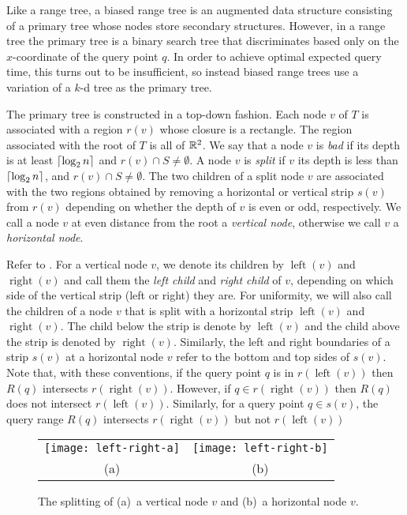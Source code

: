 \documentclass[charterfonts]{patmorin}
\DeclareMathOperator{\lft}{left}
\DeclareMathOperator{\rght}{right}
\begin{document}
Like a range tree, a biased range tree is an augmented data structure
consisting of a primary tree whose nodes store secondary structures.
However, in a range tree the primary tree is a binary search tree that
discriminates based only on the $x$-coordinate of the query point $q$.
In order to achieve optimal expected query time, this turns out to be
insufficient, so instead biased range trees use a variation of a $k$-d
tree as the primary tree.

The primary tree is constructed in a top-down fashion.  Each node $v$
of $T$ is associated with a region $r(v)$ whose closure is a
rectangle.  The region associated with the root of $T$ is all of
$\mathbb{R}^2$.  We say that a node $v$ is \emph{bad} if its depth is at least
$\left\lceil \log_2 n \right\rceil$ and $r(v)\cap S \neq \emptyset$.  A node $v$ is
\emph{split} if $v$ its depth is less than $\left\lceil \log_2 n \right\rceil$, and
$r(v)\cap S\neq \emptyset$.  The two children of a split node $v$ are
associated with the two regions obtained by removing a horizontal or
vertical strip $s(v)$ from $r(v)$ depending on whether the depth of
$v$ is even or odd, respectively.  We call a node $v$ at even distance
from the root a \emph{vertical node}, otherwise we call $v$ a
\emph{horizontal node}. 

Refer to .  For a vertical node $v$, we denote its
children by $\lft(v)$ and $\rght(v)$ and call them the \emph{left
child} and \emph{right child} of $v$, depending on which side of the
vertical strip (left or right) they are.  For uniformity, we will also
call the children of a node $v$ that is split with a horizontal strip
$\lft(v)$ and $\rght(v)$.  The child below the strip is denote by $\lft(v)$ and
the child above the strip is denoted by $\rght(v)$.
Similarly, the left and right
boundaries of a strip $s(v)$ at a horizontal node $v$ refer to the
bottom and top sides of $s(v)$.  Note that, with these conventions, if
the query point $q$ is in $r(\lft(v))$ then $R(q)$ intersects
$r(\rght(v))$.  However, if $q\in r(\rght(v))$ then $R(q)$ does not
intersect $r(\lft(v))$.  Similarly, for a query point $q\in s(v)$, the
query range $R(q)$ intersects $r(\rght(v))$ but not $r(\lft(v))$

\begin{figure}
  \begin{center}
    \begin{tabular}{cc}
      \texttt{[image: left-right-a]} & \texttt{[image: left-right-b]} \\
      (a) & (b)
    \end{tabular}
  \end{center}
  \caption{The splitting of (a)~a vertical node $v$ and (b)~a horizontal
  node $v$.}
\end{figure}
\end{document}
